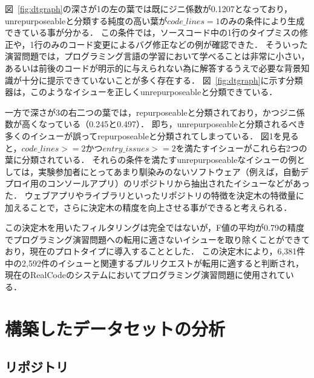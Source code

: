 図~\ref{fig:dtgraph}の深さが1の左の葉では既にジニ係数が0.1207となっており，unrepurposeableと分類する純度の高い葉が$\textit{code\_lines}=1$のみの条件により生成できている事が分かる．
この条件では，ソースコード中の1行のタイプミスの修正や，1行のみのコード変更によるバグ修正などの例が確認できた．
そういった演習問題では，プログラミング言語の学習において学べることは非常に小さい，あるいは前後のコードが明示的に与えられない為に解答するうえで必要な背景知識が十分に提示できていないことが多く存在する．
図~\ref{fig:dtgraph}に示す分類器は，このようなイシューを正しくunrepurposeableと分類できている．

一方で深さが3の右二つの葉では，repurposeableと分類されており，かつジニ係数が高くなっている（0.245と0.497）．
即ち，unrepurposeableと分類されるべき多くのイシューが誤ってrepurposeableと分類されてしまっている．
図1を見ると，$\textit{code\_lines} >= 2$かつ$\textit{entry\_issues} >= 2$を満たすイシューがこれら右2つの葉に分類されている．
それらの条件を満たすunrepurposeableなイシューの例としては，実験参加者にとってあまり馴染みのないソフトウェア（例えば，自動デプロイ用のコンソールアプリ）のリポジトリから抽出されたイシューなどがあった．
ウェブアプリやライブラリといったリポジトリの特徴を決定木の特徴量に加えることで，さらに決定木の精度を向上させる事ができると考えられる．

この決定木を用いたフィルタリングは完全ではないが，F値の平均が0.79の精度でプログラミング演習問題への転用に適さないイシューを取り除くことができており，現在のプロトタイプに導入することとした．
この決定木により，6,381件中の2,592件のイシューと関連するプルリクエストが転用に適すると判断され，現在のRealCodeのシステムにおいてプログラミング演習問題に使用されている．



\section{構築したデータセットの分析}

\subsection{リポジトリ}




